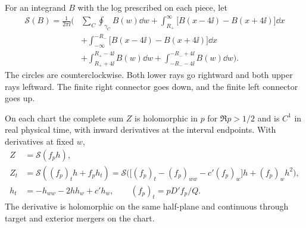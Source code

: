 For an integrand \(B\) with the log prescribed on each piece, let
\begin{equation}
\begin{aligned}
 \mathcal S(B)=\frac1{2\pi\ii}\Bigg(&
   \sum_C\oint_{\gamma_C} B(w)\dd w
   +\int_{R_+}^{\infty}\!\big[B(x-4\ii)-B(x+4\ii)\big]\dd x\\
 &+\int_{-\infty}^{-R_-}\!\big[B(x-4\ii)-B(x+4\ii)\big]\dd x\\
 &+\int_{R_++4\ii}^{R_+-4\ii} B(w)\dd w
  +\int_{-R_--4\ii}^{-R_-+4\ii} B(w)\dd w\Bigg).
\end{aligned}
\label{cp:spatial-boundary}
\end{equation}
The circles are counterclockwise. Both lower rays go rightward and
both upper rays leftward. The finite right connector goes down, and
the finite left connector goes up.

\begin{theorem}\label{thm:complex-time}
On each chart the complete sum \(Z\) is holomorphic in \(p\) for
\(\Re p>1/2\) and is \(C^1\) in real physical time, with inward
derivatives at the interval endpoints. With derivatives at fixed \(w\),
\begin{equation}
\begin{aligned}
 Z&=\mathcal S(f_ph),\\
 Z_t&=\mathcal S((f_p)_t h+f_ph_t)
   =\mathcal S\big(\big[(f_p)_t-(f_p)_{ww}-c'(f_p)_w\big]h
                                       +(f_p)_wh^2\big),\\
 h_t&=-h_{ww}-2h h_w+c' h_w,\qquad (f_p)_t=pD'f_p/Q .
\end{aligned}
\label{eq:complex-time}
\end{equation}
The derivative is holomorphic on the same half-plane and continuous
through target and exterior mergers on the chart.
\end{theorem}

